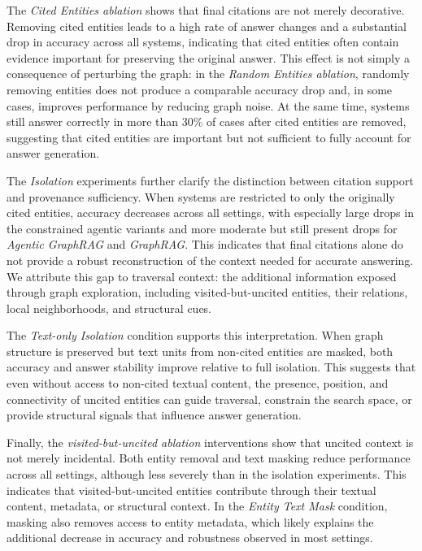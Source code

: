 \documentclass[
]{ceurart}
\begin{document}
The \textit{Cited Entities ablation} shows that final citations are not merely decorative. Removing cited entities leads to a high rate of answer changes and a substantial drop in accuracy across all systems, indicating that cited entities often contain evidence important for preserving the original answer. This effect is not simply a consequence of perturbing the graph: in the \textit{Random Entities ablation}, randomly removing entities does not produce a comparable accuracy drop and, in some cases, improves performance by reducing graph noise. At the same time, systems still answer correctly in more than 30\% of cases after cited entities are removed, suggesting that cited entities are important but not sufficient to fully account for answer generation.

The \textit{Isolation} experiments further clarify the distinction between citation support and provenance sufficiency. When systems are restricted to only the originally cited entities, accuracy decreases across all settings, with especially large drops in the constrained agentic variants and more moderate but still present drops for \textit{Agentic GraphRAG} and \textit{GraphRAG}. This indicates that final citations alone do not provide a robust reconstruction of the context needed for accurate answering. We attribute this gap to traversal context: the additional information exposed through graph exploration, including visited-but-uncited entities, their relations, local neighborhoods, and structural cues.

The \textit{Text-only Isolation} condition supports this interpretation. When graph structure is preserved but text units from non-cited entities are masked, both accuracy and answer stability improve relative to full isolation. This suggests that even without access to non-cited textual content, the presence, position, and connectivity of uncited entities can guide traversal, constrain the search space, or provide structural signals that influence answer generation.

Finally, the \textit{visited-but-uncited ablation} interventions show that uncited context is not merely incidental. Both entity removal and text masking reduce performance across all settings, although less severely than in the isolation experiments. This indicates that visited-but-uncited entities contribute through their textual content, metadata, or structural context. In the \textit{Entity Text Mask} condition, masking also removes access to entity metadata, which likely explains the additional decrease in accuracy and robustness observed in most settings.
\end{document}
